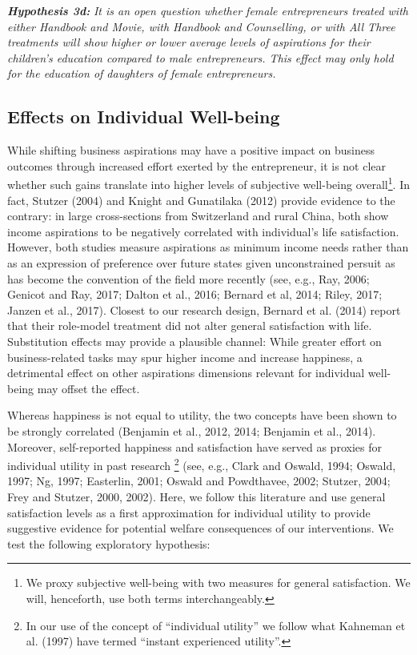 \documentclass[11.5pt]{article}
\begin{document}
\noindent \emph{\textbf{Hypothesis 3d:}} \emph{It is an open question whether female entrepreneurs treated with either \emph{Handbook and Movie}, with \emph{Handbook and Counselling}, or with \emph{All Three} treatments will show higher or lower average levels of aspirations for their children's education compared to male entrepreneurs. This effect may only hold for the education of daughters of female entrepreneurs.} \\

\subsection{Effects on Individual Well-being}

While shifting business aspirations may have a positive impact on business outcomes through increased effort exerted by the entrepreneur, it is not clear whether such gains translate into higher levels of subjective well-being overall\footnote{We proxy subjective well-being with two measures for general satisfaction. We will, henceforth, use both terms interchangeably.}. In fact, Stutzer (2004) and Knight and Gunatilaka (2012) provide evidence to the contrary: in large cross-sections from Switzerland and rural China, both show income aspirations to be negatively correlated with individual's life satisfaction. However, both studies measure aspirations as minimum income needs rather than as an expression of preference over future states given unconstrained persuit as has become the convention of the field more recently (see, e.g., Ray, 2006; Genicot and Ray, 2017; Dalton et al., 2016; Bernard et al, 2014; Riley, 2017; Janzen et al., 2017). Closest to our research design, Bernard et al. (2014) report that their role-model treatment did not alter general satisfaction with life. Substitution effects may provide a plausible channel: While greater effort on business-related tasks may spur higher income and increase happiness, a detrimental effect on other aspirations dimensions relevant for individual well-being may offset the effect. 

Whereas happiness is not equal to utility, the two concepts have been shown to be strongly correlated (Benjamin et al., 2012, 2014; Benjamin et al., 2014). Moreover, self-reported happiness and satisfaction have served as proxies for individual utility in past research \footnote{In our use of the concept of ``individual utility'' we follow what Kahneman et al. (1997) have termed ``instant experienced utility''.} (see, e.g., Clark and Oswald, 1994; Oswald, 1997; Ng, 1997; Easterlin, 2001; Oswald and Powdthavee, 2002; Stutzer, 2004; Frey and Stutzer, 2000, 2002). %
Here, we follow this literature and use general satisfaction levels as a first approximation for individual utility to provide suggestive evidence for potential welfare consequences of our interventions. We test the following exploratory hypothesis: \\
\end{document}
